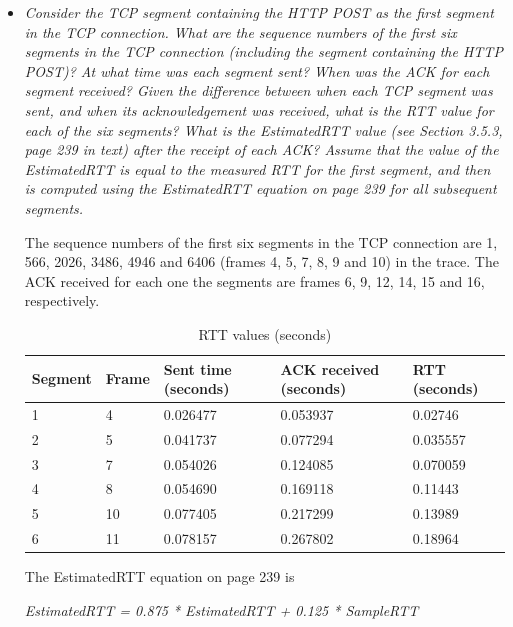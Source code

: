 \documentclass[11pt]{article}
\begin{document}
\begin{itemize}
	\item
		\textit{Consider the TCP segment containing the HTTP POST as the first segment in the TCP connection. What are the sequence numbers of the first six segments in the TCP connection (including the segment containing the HTTP POST)? At what time was each segment sent? When was the ACK for each segment received? Given the difference between when each TCP segment was sent, and when its acknowledgement was received, what is the RTT value for each of the six segments? What is the EstimatedRTT value (see Section 3.5.3, page 239 in text) after the receipt of each ACK? Assume that the value of the EstimatedRTT is equal to the measured RTT for the first segment, and then is computed using the EstimatedRTT equation on page 239 for all subsequent segments.}
		\par The sequence numbers of the first six segments in the TCP connection are 1, 566, 2026, 3486, 4946 and 6406 (frames 4, 5, 7, 8, 9 and 10) in the trace. The ACK received for each one the segments are frames 6, 9, 12, 14, 15 and 16, respectively.

\begin{table}[H]
\centering
\caption{RTT values (seconds)}
\label{rtt-values}
\begin{tabular}{@{}lllll@{}}
\toprule
Segment & Frame & Sent time (seconds) & ACK received (seconds) & RTT (seconds) \\ \midrule
1       & 4     & 0.026477            & 0.053937               & 0.02746       \\
2       & 5     & 0.041737            & 0.077294               & 0.035557      \\
3       & 7     & 0.054026            & 0.124085               & 0.070059      \\
4       & 8     & 0.054690            & 0.169118               & 0.11443       \\
5       & 10    & 0.077405            & 0.217299               & 0.13989       \\
6       & 11    & 0.078157            & 0.267802               & 0.18964       \\ \bottomrule
\end{tabular}
\end{table}

\par The EstimatedRTT equation on page 239 is
\par \textit{EstimatedRTT = 0.875 * EstimatedRTT + 0.125 * SampleRTT}
\newline


\end{itemize}
\end{document}
